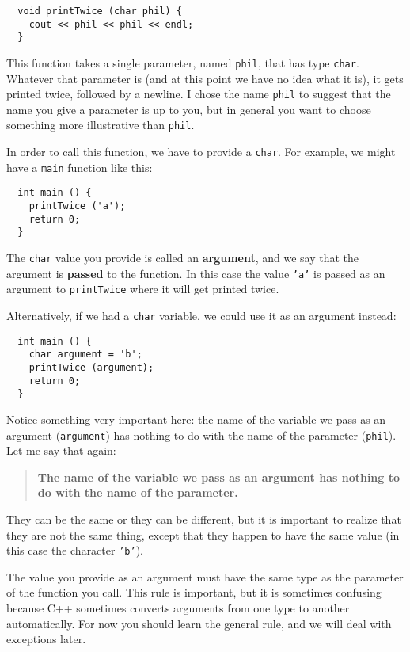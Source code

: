 \begin{lstlisting}
  void printTwice (char phil) {
    cout << phil << phil << endl;
  }
\end{lstlisting}
%
This function takes a single parameter, named {\tt phil}, that
has type {\tt char}.  Whatever that parameter is (and at
this point we have no idea what it is), it gets printed
twice, followed by a newline.
I chose the name {\tt phil} to suggest that the name
you give a parameter is up to you, but in general you want to
choose something more illustrative than {\tt phil}.

In order to call this function, we have to provide a {\tt char}.
For example, we might have a {\tt main} function like this:

\begin{lstlisting}
  int main () {
    printTwice ('a');
    return 0;
  }
\end{lstlisting}
%
The {\tt char} value you provide is called an {\bf argument}, and we
say that the argument is {\bf passed} to the function.  In this
case the value {\tt 'a'} is passed as an argument
to {\tt printTwice} where it will get printed twice.

Alternatively, if we had a {\tt char} variable, we could
use it as an argument instead:

\begin{lstlisting}
  int main () {
    char argument = 'b';
    printTwice (argument);
    return 0;
  }
\end{lstlisting}
%
Notice something very important here: the name of the variable we pass
as an argument ({\tt argument}) has nothing to do with the name of the
parameter ({\tt phil}).  Let me say that again:

\begin{quote}

{\bf The name of the variable we pass as an argument has nothing to do
with the name of the parameter.}

\end{quote}

They can be the same or they can be different, but it is important
to realize that they are not the same thing, except that they happen
to have the same value (in this case the character {\tt 'b'}).

The value you provide as an argument must have the same type as
the parameter of the function you call.  This rule is
important, but it is sometimes confusing because C++ sometimes
converts arguments from one type to another automatically.  For
now you should learn the general rule, and we will deal with
exceptions later.

